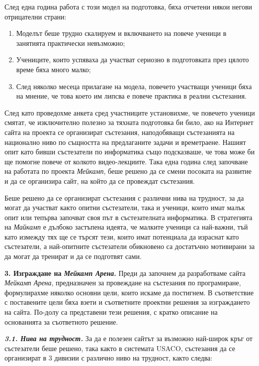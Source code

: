 \documentclass[11pt]{article}
\begin{document}
След една година работа с този модел на подготовка, бяха отчетени
някои негови отрицателни страни:

\begin{enumerate}
\item
Моделът беше трудно скалируем и включването на повече ученици в
занятията практически невъзможно;

\item
Учениците, които успяваха да участват сериозно в подготовката през
цялото време бяха много малко;

\item
След няколко месеца прилагане на модела, повечето участващи ученици
бяха на мнение, че това което им липсва е повече практика в реални
състезания.
\end{enumerate}

След като проведохме анкета сред участниците установихме, че
повечето ученици смятат, че изключително полезно за тяхната
подготовка би било, ако на Интернет сайта на проекта се организират
състезания, наподобяващи състезанията на национално ниво по
същността на предлаганите задачи и времетраене. Нашият опит като
бивши състезатели по информатика също подсказваше, че това може би
ще помогне повече от колкото видео-лекциите. Така една година след
започване на работата по проекта \textit{Мейкамп}, беше решено да се
смени посоката на развитие и да се организира сайт, на който да се
провеждат състезания.

Беше решено да се организират състезания с различни нива на
трудност, за да могат да участват както опитни състезатели, така и
ученици, които имат малък опит или тепърва започват своя път в
състезателната информатика. В стратегията на \textit{Майкамп} е
дълбоко застъпена идеята, че малките ученици са най-важни, тъй като
измежду тях ще се търсят тези, които имат потенциала да израснат
като състезатели, а най-опитните състезатели обикновено са
достатъчно мотивирани за да могат да тренират и да се подготвят
сами.

\textbf{3. Изграждане на \textit{Мейкамп Арена}.} Преди да започнем
да разработваме сайта \textit{Мейкамп Арена}, предназначен за
провеждане на състезания по програмиране, формулирахме няколко
основни цели, които искаме да постигнем. В съответствие с
поставените цели бяха взети и съответните проектни решения за
изграждането на сайта. По-долу са представени тези решения, с кратко
описание на основанията за съответното решение.

\textit{\textbf{3.1. Нива на трудност.}} За да е полезен сайтът за
възможно най-широк кръг от състезатели беше решено, така както в
системата USACO, състезания да се организират в 3 дивизии с различно
ниво на трудност, както следва:
\end{document}
